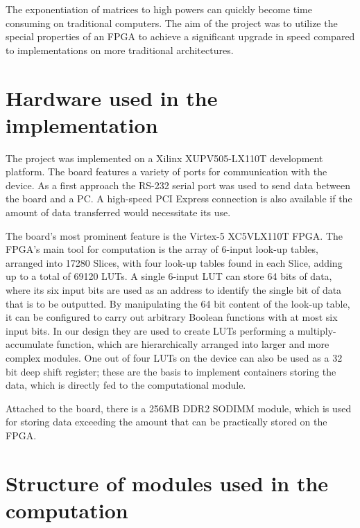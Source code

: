 \documentclass[11pt,twoside]{article}
\begin{document}
The exponentiation of matrices to high powers can quickly become time consuming on traditional computers. The aim of the project was to utilize the special properties of an FPGA to achieve a significant upgrade in speed compared to implementations on more traditional architectures.

\section{Hardware used in the implementation}

The project was implemented on a Xilinx XUPV505-LX110T development platform. The board features a variety of ports for communication with the device. As a first approach the RS-232 serial port was used to send data between the board and a PC. A high-speed PCI Express connection is also available if the amount of data transferred would necessitate its use.

The board's most prominent feature is the Virtex-5 XC5VLX110T FPGA. The FPGA's main tool for computation is the array of 6-input look-up tables, arranged into 17280 Slices, with four look-up tables found in each Slice, adding up to a total of 69120 LUTs. A single 6-input LUT can store 64 bits of data, where its six input bits are used as an address to identify the single bit of data that is to be outputted. By manipulating the 64 bit content of the look-up table, it can be configured to carry out arbitrary Boolean functions with at most six input bits. In our design they are used to create LUTs performing a multiply-accumulate function, which are hierarchically arranged into larger and more complex modules. One out of four LUTs on the device can also be used as a 32 bit deep shift register; these are the basis to implement containers storing the data, which is directly fed to the computational module.

Attached to the board, there is a 256MB DDR2 SODIMM module, which is used for storing data exceeding the amount that can be practically stored on the FPGA.

\section{Structure of modules used in the computation}
\end{document}
